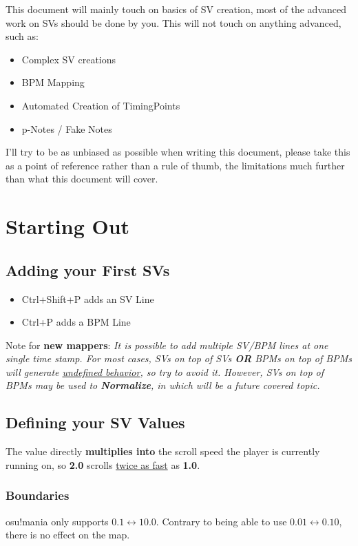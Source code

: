 This document will mainly touch on basics of SV creation, most of the advanced work on SVs should be done by you.
This will not touch on anything advanced, such as:
\begin{itemize}
\item Complex SV creations
\item BPM Mapping
\item Automated Creation of TimingPoints
\item p-Notes / Fake Notes
\end{itemize}

I’ll try to be as unbiased as possible when writing this document, please take this as a point of reference rather than a rule of thumb, the limitations much further than what this document will cover.

\section{Starting Out}

\subsection{Adding your First SVs}
\begin{itemize}
    \item Ctrl+Shift+P adds an SV Line
    \item Ctrl+P adds a BPM Line
\end{itemize}
Note for \textbf{new mappers}: \newline 
\textit{It is possible to add multiple SV/BPM lines at one single time stamp. For most cases, SVs on top of SVs \textbf{OR} BPMs on top of BPMs will generate \underline{undefined behavior}, so try to avoid it. \newline
However, SVs on top of BPMs may be used to \textbf{Normalize}, in which will be a future covered topic.}

\subsection{Defining your SV Values}
The value directly \textbf{multiplies into} the scroll speed the player is currently running on, so \textbf{2.0} scrolls \underline{twice as fast} as \textbf{1.0}.
\subsubsection{Boundaries}
osu!mania only supports $0.1 \longleftrightarrow 10.0$. \newline Contrary to being able to use $0.01 \longleftrightarrow 0.10$, there is no effect on the map.

